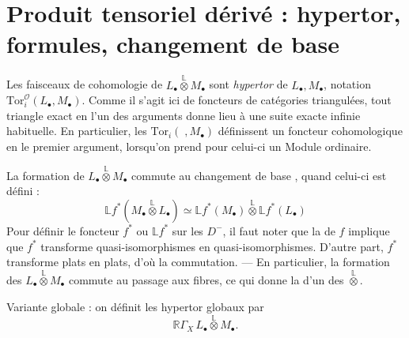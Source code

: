 \documentclass[11pt,a4paper]{article}
\begin{document}
\section{Produit tensoriel dérivé : hypertor, formules, changement de base}

Les \struck{\ill{}} faisceaux de cohomologie de $L_{\bullet} \overset{\mathbb{L}}{\otimes} M_{\bullet}$ sont  \emph{hypertor} de $L_{\bullet}, M_{\bullet}$, notation $\mathrm{Tor}_i^{\mathcal{O}}(L_{\bullet}, M_{\bullet})$. \struck{\ill{}} Comme il s'agit ici de foncteurs  de catégories triangulées, tout triangle exact en l'un des arguments donne lieu à une suite exacte infinie habituelle. En particulier, les $\mathrm{Tor}_i( \;, M_{\bullet})$ définissent un foncteur cohomologique en le premier argument, lorsqu'on prend pour celui-ci un Module ordinaire.

La formation de $L_{\bullet} \overset{\mathbb{L}}{\otimes} M_{\bullet}$ commute au changement de base  , quand celui-ci est défini \struck{[\ill{}]} \ill{} :
\[
  \mathbb{L}f^{*}(M_{\bullet} \overset{\mathbb{L}}{\otimes} L_{\bullet})
  \simeq \mathbb{L}f^{*}(M_{\bullet}) \overset{\mathbb{L}}{\otimes} \mathbb{L}f^{*}(L_{\bullet})
\]
Pour définir le foncteur $f^{*}$ ou $\mathbb{L}f^{*}$ sur les $D^{-}$, il faut noter que la  de $f$ implique que $f^{*}$ transforme quasi-isomorphismes  en quasi-isomorphismes. D'autre part, $f^{*}$ transforme plats en plats, d'où la commutation. — En particulier, la formation des $L_{\bullet} \overset{\mathbb{L}}{\otimes} M_{\bullet}$ commute au passage aux fibres, ce qui donne la  d'un   \ill{} \ill{} des $\overset{\mathbb{L}}{\otimes}$.

Variante globale : on définit les hypertor globaux par
\[
  \mathbb{R}\Gamma_{X}\, L_{\bullet} \overset{\mathbb{L}}{\otimes} M_{\bullet} .
\]
\end{document}
